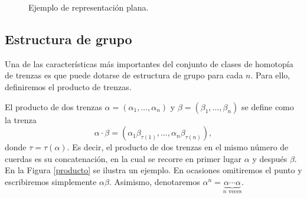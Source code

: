 \documentclass[TFG.tex]{subfiles}
\begin{document}
\begin{figure}[h!]
\centering
{}
\caption{Ejemplo de representación plana.}\label{plana}
\end{figure}




\subsection{Estructura de grupo}
Una de las características más importantes del conjunto de clases de homotopía de trenzas es que puede dotarse de estructura de grupo para cada $n$. Para ello, definiremos el producto de trenzas. 

\begin{defi}
El producto de dos trenzas $\alpha=(\alpha_1,\dots, \alpha_n)$ y $\beta=(\beta_1,\dots,\beta_n)$ se define como la trenza
$$\alpha\cdot\beta = (\alpha_1\beta_{\tau(1)},\dots, \alpha_n\beta_{\tau(n)}),$$
donde $\tau=\tau(\alpha)$. Es decir, el producto de dos trenzas en el mismo número de cuerdas es su concatenación, en la cual se recorre en primer lugar $\alpha$ y después $\beta$. En la Figura \ref{producto} se ilustra un ejemplo. En ocasiones omitiremos el punto y escribiremos simplemente $\alpha\beta$. Asimismo, denotaremos $\alpha^n=\underbrace{\alpha\cdots\alpha}_{n\text{ veces}}$.
\end{defi}
\end{document}
